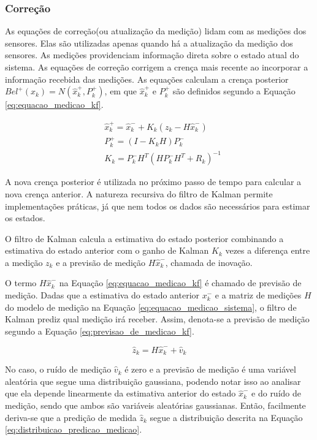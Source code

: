 \documentclass[acronym, symbols]{fei}
\begin{document}
			\subsubsection{Correção}
				As equações de correção(ou atualização da medição) lidam com as medições dos sensores. Elas são utilizadas apenas quando há a atualização da medição dos sensores. As medições providenciam informação direta sobre o estado atual do sistema. As equações de correção corrigem a crença mais recente ao incorporar a informação recebida das medições. As equações calculam a crença posterior $Bel^{+}(x_k) = N(\hat{x}_{k}^{+},P_{k}^{+})$, em que $\hat{x}_{k}^{+}$ e $P_{k}^{+}$ são definidos segundo a Equação \eqref{eq:equacao_medicao_kf}.
				
				\begin{equation} \label{eq:equacao_medicao_kf}
					\begin{split}
						&\hat{x}_{k}^{+} = \hat{x}_{k}^{-} + K_{k}(z_k - H\hat{x}_{k}^{-}) \\
						&P_{k}^{+} = (I - K_kH)P_{k}^{-} \\
						&K_k =  P_{k}^{-}H^T(HP_{k}^{-}H^T + R_k)^{-1}
					\end{split}
				\end{equation}
			
				A nova crença posterior é utilizada no próximo passo de tempo para calcular a nova crença anterior. A natureza recursiva do filtro de Kalman permite implementações práticas, já que nem todos os dados são necessários para estimar os estados.
				
				O filtro de Kalman calcula a estimativa do estado posterior combinando a estimativa do estado anterior com o ganho de Kalman $K_k$ vezes a diferença entre a medição $z_k$ e a previsão de medição $H\hat{x}_{k}^{-}$, chamada de inovação.
				
				O termo $H\hat{x}_{k}^{-}$ na Equação \eqref{eq:equacao_medicao_kf} é chamado de previsão de medição. Dadas que a estimativa do estado anterior ${x}_{k}^{-}$ e a matriz de medições $H$ do modelo de medição na Equação \eqref{eq:equacao_medicao_sistema}, o filtro de Kalman prediz qual medição irá receber. Assim, denota-se a previsão de medição segundo a Equação \eqref{eq:previsao_de_medicao_kf}.
				
				\begin{equation} \label{eq:previsao_de_medicao_kf}
					\hat{z}_k = H\hat{x}_{k}^{-} + \hat{v}_k
				\end{equation}
			
				No caso, o ruído de medição $\hat{v}_k$ é zero e a previsão de medição é uma variável aleatória que segue uma distribuição gaussiana, podendo notar isso ao analisar que ela depende linearmente da estimativa anterior do estado $\hat{x}_{k}^{-}$ e do ruído de medição, sendo que ambos são variáveis aleatórias gaussianas. Então, facilmente deriva-se que a predição de medida $\hat{z}_k$ segue a distribuição descrita na Equação \eqref{eq:distribuicao_predicao_medicao}.
				
\end{document}
